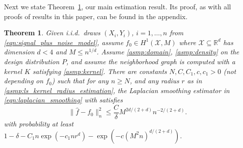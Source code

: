 \documentclass[twoside]{article}
\newcommand{\Reals}{\mathbb{R}}
\newcommand{\1}{\mathbf{1}}
\newcommand{\Rd}{\Reals^d}
\newcommand{\Xset}{\mathcal{X}}
\newcommand{\wh}[1]{\widehat{#1}}
\newtheorem{theorem}{Theorem}
\theoremstyle{definition}
\theoremstyle{remark}
\begin{document}
Next we state Theorem~\ref{thm:laplacian_smoothing_estimation1}, our main estimation result. Its proof, as with all proofs of results in this paper, can be found in the appendix. 
\begin{theorem}
	\label{thm:laplacian_smoothing_estimation1}
	Given i.i.d.\ draws $(X_i,Y_i)$, $i=1,\ldots,n$ from \eqref{eqn:signal_plus_noise_model}, assume $f_0 \in H^1(\Xset,M)$ where $\Xset \subseteq \Rd$ has dimension $d < 4$ and $M \leq n^{1/d}$. Assume \ref{asmp:domain}, \ref{asmp:density} on the design distribution $P$, and assume the neighborhood graph  is computed with a kernel $K$ satisfying \ref{asmp:kernel}. There are constants $N,C,C_1,c,c_1>0$ (not depending on $f_0$) such that for any $n \geq N$, and any radius $r$ as in \ref{asmp:ls_kernel_radius_estimation}, the Laplacian smoothing estimator \smash{$\wh{f}$} in \eqref{eqn:laplacian_smoothing} with  satisfies
	\begin{equation*}
	\bigl\|\wh{f} - f_0\bigr\|_n^2 \leq \frac{C}{\delta} M^{2d/(2 + d)} n^{-2/(2 + d)}.
	\end{equation*}
	with probability at least $1 - \delta -  C_1n\exp(-c_1nr^d) - \exp(-c (M^2n)^{d/(2 + d)})$.
\end{theorem}
\end{document}
